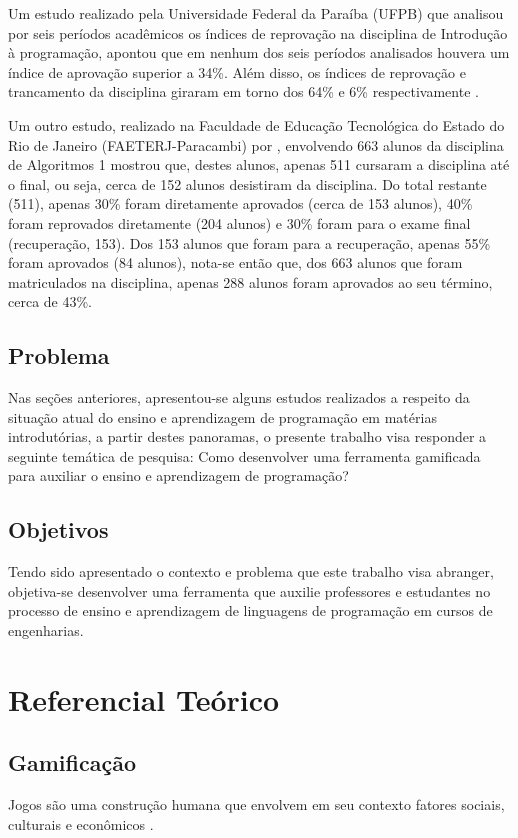 Um estudo realizado pela Universidade Federal da Paraíba (UFPB) que analisou por seis períodos 
acadêmicos os índices de reprovação na disciplina de Introdução à programação, apontou que 
em nenhum dos seis períodos analisados houvera um índice de aprovação superior a 34\%. Além disso,
os índices de reprovação e trancamento da disciplina giraram em torno dos 64\% e 6\% respectivamente \cite{SBIE6739}.

Um outro estudo, realizado na Faculdade de Educação Tecnológica do Estado do Rio de Janeiro (FAETERJ-Paracambi) por , 
envolvendo 663 alunos da disciplina de Algoritmos 1 mostrou que, destes alunos, apenas 511 cursaram a disciplina 
até o final, ou seja, cerca de 152 alunos desistiram da disciplina. Do total restante (511), apenas 30\% foram
diretamente aprovados (cerca de 153 alunos), 40\% foram reprovados diretamente (204 alunos) e 30\% foram para o exame final (recuperação, 153).
Dos 153 alunos que foram para a recuperação, apenas 55\% foram aprovados (84 alunos), nota-se então que, dos 663 alunos que
foram matriculados na disciplina, apenas  288 alunos foram aprovados ao seu término, cerca de 43\%.

\section{Problema}
Nas seções anteriores, apresentou-se alguns estudos realizados a respeito da situação atual do ensino e aprendizagem
de programação em matérias introdutórias, a partir destes panoramas, o presente trabalho visa responder a seguinte temática
de pesquisa:
Como desenvolver uma ferramenta gamificada para auxiliar o ensino e aprendizagem de programação?
 
\section{Objetivos}
Tendo sido apresentado o contexto e problema que este trabalho visa abranger, objetiva-se
desenvolver uma ferramenta que auxilie professores e estudantes no processo de ensino e aprendizagem
de linguagens de programação em cursos de engenharias.

\chapter[Referencial Teórico]{Referencial Teórico}

\section{Gamificação}
Jogos são uma construção humana que envolvem em seu contexto fatores sociais, culturais e econômicos \cite{EaDF440}.

